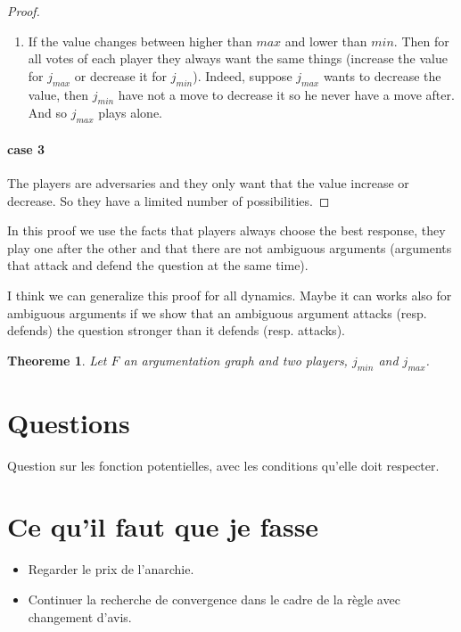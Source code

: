 \documentclass[12pt]{article}
\newtheorem{theoreme}{Theoreme}[section]
\theoremstyle{defi}
\theoremstyle{not}
\theoremstyle{prob}
\begin{document}
\begin{proof}
\begin{enumerate}
          \item If the value changes between higher than $max$ and lower than $min$. Then for all votes of each player they always want the same things (increase the value for $j_{max}$ or decrease it for $j_{min}$). Indeed, suppose $j_{max}$ wants to decrease the value, then $j_{min}$ have not a move to decrease it so he never have a move after. And so $j_{max}$ plays alone.
        \end{enumerate}

        \paragraph{case 3}
          The players are adversaries and they only want that the value increase or decrease. So they have a limited number of possibilities.
      \end{proof}

      In this proof we use the facts that players always choose the best response, they play one after the other and that there are not ambiguous arguments (arguments that attack and defend the question at the same time).

      I think we can generalize this proof for all dynamics. Maybe it can works also for ambiguous arguments if we show that an ambiguous argument attacks (resp. defends) the question stronger than it defends (resp. attacks).



      \begin{theoreme}
        Let $F$ an argumentation graph and two players, $j_{min}$ and $j_{max}$.
      \end{theoreme}
\color{black}
  \section{Questions}
  \color{blue}
  Question sur les fonction potentielles, avec les conditions qu'elle doit respecter.
\color{black}
  \section{Ce qu'il faut que je fasse}

    \begin{itemize}
      \item Regarder le prix de l'anarchie.
      \item Continuer la recherche de convergence dans le cadre de la règle avec changement d'avis.
    \end{itemize}
\end{document}
